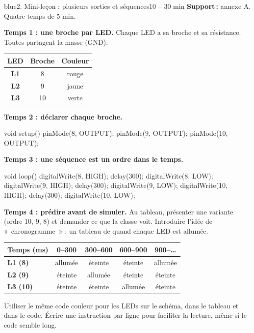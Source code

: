 \documentclass[11pt,a4paper]{article}
\begin{document}
\begin{etape}{blue}{2. Mini-leçon : plusieurs sorties et séquences}{10 -- 30 min}
\textbf{Support\,:} annexe A. Quatre temps de 5 min.

\textbf{Temps 1 : une broche par LED.} Chaque LED a sa broche et sa résistance. Toutes partagent la masse (GND).

\begin{center}
\begin{tabularx}{0.9\linewidth}{>{\bfseries}c c c}
\toprule
LED & Broche & Couleur\\
\midrule
L1 & 8 & rouge\\
L2 & 9 & jaune\\
L3 & 10 & verte\\
\bottomrule
\end{tabularx}
\end{center}

\textbf{Temps 2 : déclarer chaque broche.}
\begin{arduino}[Déclarations]
void setup() {
  pinMode(8, OUTPUT);
  pinMode(9, OUTPUT);
  pinMode(10, OUTPUT);
}
\end{arduino}

\textbf{Temps 3 : une séquence est un ordre dans le temps.}
\begin{arduino}
void loop() {
  digitalWrite(8, HIGH);  delay(300);  digitalWrite(8, LOW);
  digitalWrite(9, HIGH);  delay(300);  digitalWrite(9, LOW);
  digitalWrite(10, HIGH); delay(300);  digitalWrite(10, LOW);
}
\end{arduino}

\textbf{Temps 4 : prédire avant de simuler.} Au tableau, présenter une variante (ordre 10, 9, 8) et demander ce que la classe voit. Introduire l'idée de «~chronogramme~» : un tableau de quand chaque LED est allumée.

\begin{center}
\begin{tabularx}{\linewidth}{>{\bfseries}p{2cm}c c c c}
\toprule
Temps (ms) & 0--300 & 300--600 & 600--900 & 900--\ldots\\
\midrule
L1 (8) & allumée & éteinte & éteinte & allumée\\
L2 (9) & éteinte & allumée & éteinte & éteinte\\
L3 (10) & éteinte & éteinte & allumée & éteinte\\
\bottomrule
\end{tabularx}
\end{center}

\begin{astuce}
Utiliser le même code couleur pour les LEDs sur le schéma, dans le tableau et dans le code. Écrire une instruction par ligne pour faciliter la lecture, même si le code semble long.
\end{astuce}
\end{etape}
\end{document}
